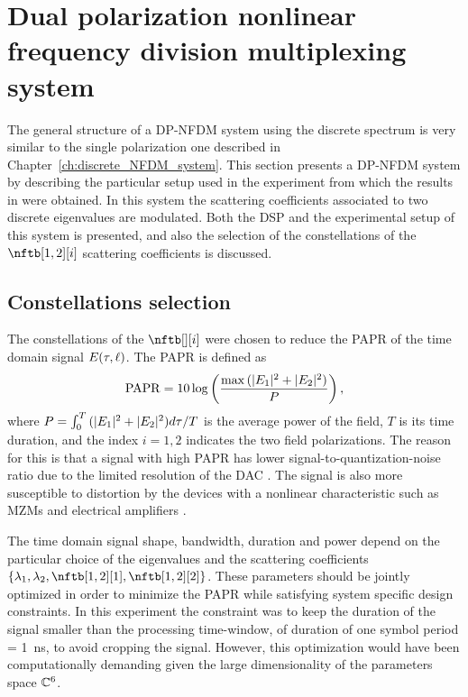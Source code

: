\section{Dual polarization nonlinear frequency division multiplexing system}\label{sec:nfdm_system}
The general structure of a \ac{DP-NFDM} system using the discrete spectrum is very similar to the single polarization one described in Chapter~\ref{ch:discrete_NFDM_system}.
This section presents a \ac{DP-NFDM} system by describing the particular setup used in the experiment from which the results in \cite{GaiarinECOC17,Gaiarin2018} were obtained. In this system the scattering coefficients associated to two discrete eigenvalues are modulated. Both the \ac{DSP} and the experimental setup of this system is presented, and also the selection of the constellations of the $\nftb[1,2][i]$ scattering coefficients is discussed.

\subsection{Constellations selection}\label{sec:constellation_selection}

The constellations of the \scatcoef{} $\nftb[][i]$  were chosen to reduce the \ac{PAPR} of the time domain signal $\fld(\ttm, \ssp)$. The \ac{PAPR} is defined as
\begin{equation}
\papr = 10 \log \left( \dfrac{ \max{(|\fld[1]|^2 + |\fld[2]|^2})}{P} \right),
\end{equation}
where $P = \int_0^{T}{ (|\fld[1]|^2 + |\fld[2]|^2}) d\ttm / T$ is the average power of the field,  $T$ is its time duration, and the index $i=1,2$ indicates the two field polarizations.
The reason for this is that a signal with high \ac{PAPR} has lower signal-to-quantization-noise ratio due to the limited resolution of the \ac{DAC} \cite{benvenuto2011principles}. The signal is also more susceptible to distortion by the devices with a nonlinear characteristic such as \acp{MZM} and electrical amplifiers \cite{le2014peak,armstrong2009ofdm}.

The time domain signal shape, bandwidth, duration and power depend on the particular choice of the eigenvalues and the scattering coefficients $\{\eig[1], \eig[2], \nftb[1,2][1],  \nftb[1,2][2]\}$. These parameters should be jointly optimized in order to minimize the \ac{PAPR} while satisfying system specific design constraints. In this experiment the constraint was to keep the duration of the signal smaller than the processing time-window, of duration of one symbol period \Ts{} = \SI{1}{\ns}, to avoid cropping the signal. However, this optimization would have been computationally demanding given the large dimensionality of the parameters space $\CC^6$.

